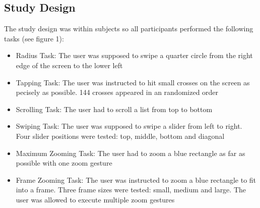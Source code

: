 \documentclass{sigchi}
\begin{document}
\subsection{Study Design}
The study design was within subjects so all participants performed the following tasks (see figure 1):
\begin{itemize}
	\item{Radius Task:} The user was supposed to swipe a quarter circle from the right edge of the screen to the lower left
	\item{Tapping Task:} The user was instructed to hit small crosses on the screen as pecisely as possible. 144 crosses appeared in an randomized order
	\item{Scrolling Task:} The user had to scroll a list from top to bottom
	\item{Swiping Task:} The user was supposed to swipe a slider from left to right. Four slider positions were tested: top, middle, bottom and diagonal
	\item{Maximum Zooming Task:} The user had to zoom a blue rectangle as far as possible with one zoom gesture
	\item{Frame Zooming Task:} The user was instructed to zoom a blue rectangle to fit into a frame. Three frame sizes were tested: small, medium and large. The user was allowed to execute multiple zoom gestures
\end{itemize}
\end{document}
